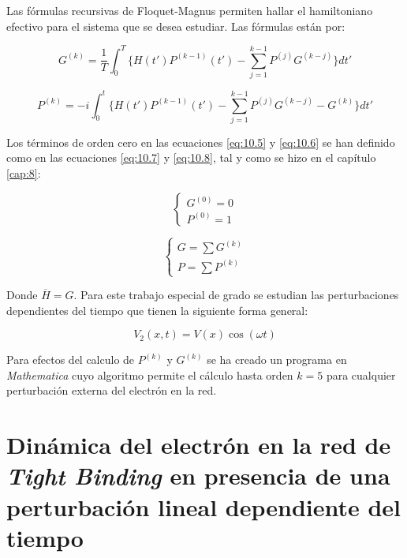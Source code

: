 Las fórmulas recursivas de Floquet-Magnus permiten hallar el hamiltoniano efectivo para el sistema que se desea estudiar. Las fórmulas están por: 

\begin{equation}\label{eq:10.5}
    G^{(k)}=\frac{1}{T}\int^{T}_{0}\{ H(t')P^{(k-1)}(t')-\sum^{k-1}_{j=1} P^{(j)}G^{(k-j)}\}dt'
\end{equation}

\begin{equation}\label{eq:10.6}
    P^{(k)}=-i\int^{t}_{0}\{ H(t')P^{(k-1)}(t')-\sum^{k-1}_{j=1} P^{(j)}G^{(k-j)}-G^{(k)}\}dt'
\end{equation}

Los términos de orden cero en las ecuaciones \ref{eq:10.5} y \ref{eq:10.6} se han definido como en las ecuaciones \ref{eq:10.7} y \ref{eq:10.8}, tal y como se hizo en el capítulo \ref{cap:8}:

\begin{equation}\label{eq:10.7}
    \begin{cases}
        G^{(0)}=0\\
        P^{(0)}=1
    \end{cases}
\end{equation}

\begin{equation}\label{eq:10.8}
\begin{cases}
    G=\sum G^{(k)}\\
    P=\sum P^{(k)}
    \end{cases}
\end{equation}

Donde $\overline{H}=G$. Para este trabajo especial de grado se estudian las perturbaciones dependientes del tiempo que tienen la siguiente forma general:

\begin{equation}\label{eq:10.9}
    V_2(x,t)=V(x)\cos(\omega t)
\end{equation}

Para efectos del calculo de $P^{(k)}$ y $G^{(k)}$ se ha creado un programa en \textit{Mathematica} cuyo algoritmo permite el cálculo hasta orden $k=5$ para cualquier perturbación externa del electrón en la red. 

\section{Dinámica del electrón en la red de \textit{Tight Binding} en presencia de una perturbación lineal dependiente del tiempo }

